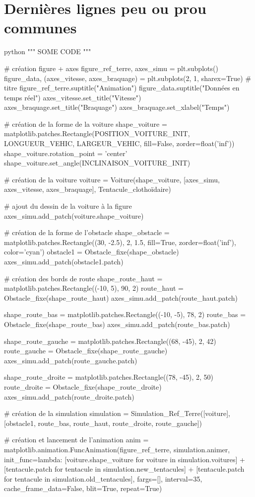 \chapter{Dernières lignes peu ou prou communes}
\begin{mintedbox}{python}
"""
SOME CODE
"""


# création figure + axes
figure_ref_terre, axes_simu = plt.subplots()
figure_data, (axes_vitesse, axes_braquage) = plt.subplots(2, 1, sharex=True)
# titre
figure_ref_terre.suptitle("Animation")
figure_data.suptitle("Données en temps réel")
axes_vitesse.set_title("Vitesse")
axes_braquage.set_title("Braquage")
axes_braquage.set_xlabel("Temps")

# création de la forme de la voiture
shape_voiture = matplotlib.patches.Rectangle(POSITION_VOITURE_INIT, LONGUEUR_VEHIC, LARGEUR_VEHIC, fill=False, zorder=float('inf'))
shape_voiture.rotation_point = 'center'
shape_voiture.set_angle(INCLINAISON_VOITURE_INIT)

# création de la voiture
voiture = Voiture(shape_voiture, [axes_simu, axes_vitesse, axes_braquage], Tentacule_clothoïdaire)

# ajout du dessin de la voiture à la figure
axes_simu.add_patch(voiture.shape_voiture)

# création de la forme de l'obstacle
shape_obstacle = matplotlib.patches.Rectangle((30, -2.5), 2, 1.5, fill=True, zorder=float('inf'), color='cyan')
obstacle1 = Obstacle_fixe(shape_obstacle)
axes_simu.add_patch(obstacle1.patch)

# création des bords de route
shape_route_haut = matplotlib.patches.Rectangle((-10, 5), 90, 2)
route_haut = Obstacle_fixe(shape_route_haut)
axes_simu.add_patch(route_haut.patch)

shape_route_bas = matplotlib.patches.Rectangle((-10, -5), 78, 2)
route_bas = Obstacle_fixe(shape_route_bas)
axes_simu.add_patch(route_bas.patch)

shape_route_gauche = matplotlib.patches.Rectangle((68, -45), 2, 42)
route_gauche = Obstacle_fixe(shape_route_gauche)
axes_simu.add_patch(route_gauche.patch)

shape_route_droite = matplotlib.patches.Rectangle((78, -45), 2, 50)
route_droite = Obstacle_fixe(shape_route_droite)
axes_simu.add_patch(route_droite.patch)

# création de la simulation
simulation = Simulation_Ref_Terre([voiture], [obstacle1, route_bas, route_haut, route_droite, route_gauche])

# création et lancement de l'animation
anim = matplotlib.animation.FuncAnimation(figure_ref_terre,
                                          simulation.animer,
                                          init_func=lambda: [voiture.shape_voiture for voiture in simulation.voitures] + [tentacule.patch for tentacule in simulation.new_tentacules] + [tentacule.patch for tentacule in simulation.old_tentacules],
                                          fargs=[],
                                          interval=35,
                                          cache_frame_data=False,
                                          blit=True,
                                          repeat=True)


\end{mintedbox}
